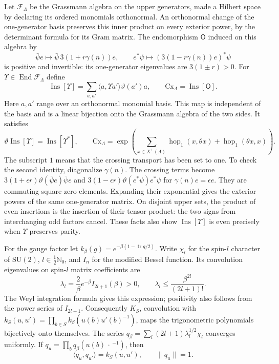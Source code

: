 \documentclass[11pt,letterpaper,reqno]{amsart}
\theoremstyle{definition}
\theoremstyle{remark}
\begin{document}
Let $\mathcal F_\Lambda$ be the Grassmann algebra on the upper
generators, made a Hilbert space by declaring its ordered monomials
orthonormal. An orthonormal change of the one-generator basis
preserves this inner product on every exterior power, by the
determinant formula for its Gram matrix. The endomorphism
$\mathsf O$ induced on this algebra by
\[
 \bar\psi e\longmapsto\bar\psi\,3(1+r\gamma(n))e,
 \qquad e^*\psi\longmapsto(3(1-r\gamma(n))e)^*\psi
\]
is positive and invertible: its one-generator eigenvalues are
$3(1\pm r)>0$. For $\Upsilon\in\operatorname{End}\mathcal F_\Lambda$
define
\begin{equation}\label{C-386-41}
 \operatorname{Ins}[\Upsilon]=
       \sum_{a,a'}\langle a,\Upsilon a'\rangle\vartheta(a')a,
 \qquad \mathrm{Cx}_\Lambda=\operatorname{Ins}[\mathsf O].
\end{equation}
Here $a,a'$ range over an orthonormal monomial basis. This map
is independent of the basis and is a linear bijection onto the
Grassmann algebra of the two sides. It satisfies
\[
 \vartheta\operatorname{Ins}[\Upsilon]
      =\operatorname{Ins}[\Upsilon^*],\qquad
 \mathrm{Cx}_\Lambda
       =\exp\left(\sum_{x\in X^+(\Lambda)}
          \operatorname{hop}_1(x,\theta x)
                   +\operatorname{hop}_1(\theta x,x)\right).
\]
The subscript $1$ means that the crossing transport has been set
to one. To check the second identity, diagonalize $\gamma(n)$.
The crossing terms become
$3(1+\epsilon r)\vartheta(\bar\psi e)\bar\psi e$ and
$3(1-\epsilon r)\vartheta(e^*\psi)e^*\psi$ for
$\gamma(n)e=\epsilon e$. They are commuting square-zero
elements. Expanding their exponential gives the exterior powers
of the same one-generator matrix. On disjoint upper sets, the
product of even insertions is the insertion of their tensor product:
the two signs from interchanging odd factors cancel. These facts
also show $\operatorname{Ins}[\Upsilon]$ is even precisely when
$\Upsilon$ preserves parity.

For the gauge factor let $k_\beta(g)=e^{-\beta(1-\operatorname{tr}g/2)}$.
Write $\chi_l$ for the spin-$l$ character of $\mathrm{SU}(2)$,
$l\in\tfrac12\mathbb N_0$, and $I_n$ for the modified Bessel function.
Its convolution eigenvalues on spin-$l$ matrix coefficients are
\begin{equation}\label{C-386-15}
 \lambda_l=\frac2\beta e^{-\beta}I_{2l+1}(\beta)>0,
 \qquad \lambda_l\le\frac{\beta^{2l}}{(2l+1)!}.
\end{equation}
The Weyl integration formula gives this expression; positivity
also follows from the power series of $I_{2l+1}$.
Consequently $K_S$, convolution with
$k_S(u,u')=\prod_{b\in S}k_\beta(u(b)u'(b)^{-1})$,
maps the trigonometric polynomials bijectively onto themselves.
The series
$q_\beta=\sum_l(2l+1)\lambda_l^{1/2}\chi_l$ converges
uniformly. If $q_u=\prod_bq_\beta(u(b)\,\cdot\,^{-1})$,
then
\begin{equation}\label{C-386-16}
 \langle q_u,q_{u'}\rangle=k_S(u,u'),\qquad \|q_u\|=1.
\end{equation}
\end{document}
